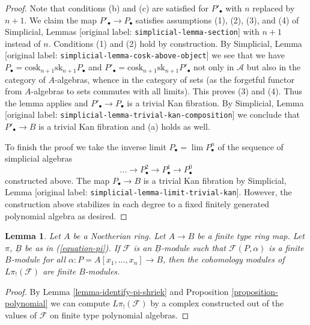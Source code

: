 \documentclass[10pt,a4paper]{article}
\theoremstyle{plain}
\newtheorem{lemma}[subsection]{Lemma}
\theoremstyle{definition}
\theoremstyle{remark}
\numberwithin{equation}{subsection}
\def\lim{\mathop{\mathrm{lim}}\nolimits}
\begin{document}
\begin{proof}
\medskip\noindent
Note that conditions (b) and (c) are satisfied for $P'_\bullet$ with $n$
replaced by $n + 1$. We claim the map $P'_\bullet \to P_\bullet$ satisfies
assumptions (1), (2), (3), and (4) of
Simplicial, Lemmas \textnormal{[original label: \nolinkurl{simplicial-lemma-section}]}
with $n + 1$ instead of $n$. Conditions (1) and (2) hold by construction.
By Simplicial, Lemma \textnormal{[original label: \nolinkurl{simplicial-lemma-cosk-above-object}]}
we see that we have
$P_\bullet = \text{cosk}_{n + 1}\text{sk}_{n + 1}P_\bullet$
and
$P'_\bullet = \text{cosk}_{n + 1}\text{sk}_{n + 1}P'_\bullet$
not only in $\mathcal{A}$ but also in the category of $A$-algebras,
whence in the category of sets (as the forgetful functor from $A$-algebras
to sets commutes with all limits). This proves (3) and (4). Thus the lemma
applies and $P'_\bullet \to P_\bullet$ is a trivial Kan fibration. By
Simplicial, Lemma \textnormal{[original label: \nolinkurl{simplicial-lemma-trivial-kan-composition}]}
we conclude that $P'_\bullet \to B$ is a trivial Kan fibration and (a)
holds as well.

\medskip\noindent
To finish the proof we take the inverse limit $P_\bullet = \lim P^n_\bullet$
of the sequence of simplicial algebras
$$
\ldots \to P^2_\bullet \to P^1_\bullet \to P^0_\bullet
$$
constructed above. The map $P_\bullet \to B$ is a trivial Kan fibration by
Simplicial, Lemma \textnormal{[original label: \nolinkurl{simplicial-lemma-limit-trivial-kan}]}.
However, the construction above stabilizes in each degree
to a fixed finitely generated polynomial algebra as desired.
\end{proof}

\begin{lemma}
\label{lemma-pi-shriek-finite}
Let $A$ be a Noetherian ring. Let $A \to B$ be a finite type ring map.
Let $\pi$, $\underline{B}$ be as in (\ref{equation-pi}).
If $\mathcal{F}$ is an $\underline{B}$-module such that
$\mathcal{F}(P, \alpha)$ is a finite $B$-module for all
$\alpha : P = A[x_1, \ldots, x_n] \to B$, then the cohomology modules
of $L\pi_!(\mathcal{F})$ are finite $B$-modules.
\end{lemma}

\begin{proof}
By Lemma \ref{lemma-identify-pi-shriek} and
Proposition \ref{proposition-polynomial}
we can compute $L\pi_!(\mathcal{F})$ by a complex
constructed out of the values of $\mathcal{F}$ on finite type
polynomial algebras.
\end{proof}
\end{document}
